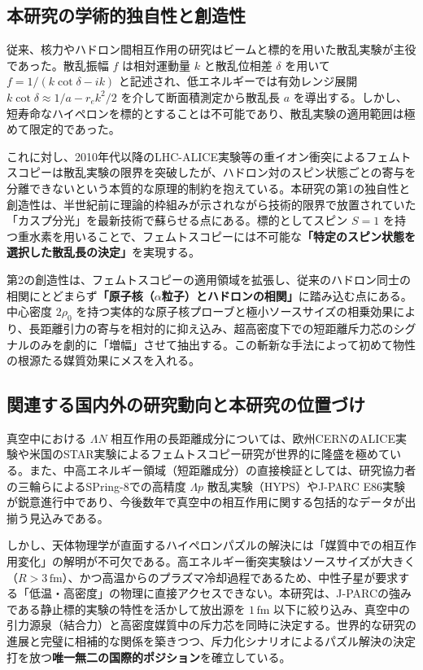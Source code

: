 \documentclass[11pt,a4j,dvipdfmx]{jarticle} 					%
\newcommand{\研究課題名}{加速器実験による短距離バリオン間相互作用の解明と中性子星ハイペロンパズルの解決}
\newcommand{\研究機関名}{東北大学}
\newcommand{\研究代表者氏名}{市川裕大}
\newcommand{\研究期間の最終元号年度}{13}  %
\begin{document}
\subsection{本研究の学術的独自性と創造性}
従来、核力やハドロン間相互作用の研究はビームと標的を用いた散乱実験が主役であった。散乱振幅 $f$ は相対運動量 $k$ と散乱位相差 $\delta$ を用いて $f = 1 / (k\cot\delta - i k)$ と記述され、低エネルギーでは有効レンジ展開 $k\cot\delta \approx 1/a - r_e k^2 / 2$ を介して断面積測定から散乱長 $a$ を導出する。しかし、短寿命なハイペロンを標的とすることは不可能であり、散乱実験の適用範囲は極めて限定的であった。

これに対し、2010年代以降のLHC-ALICE実験等の重イオン衝突によるフェムトスコピーは散乱実験の限界を突破したが、ハドロン対のスピン状態ごとの寄与を分離できないという本質的な原理的制約を抱えている。本研究の第1の独自性と創造性は、半世紀前に理論的枠組みが示されながら技術的限界で放置されていた「カスプ分光」を最新技術で蘇らせる点にある。標的としてスピン $S=1$ を持つ重水素を用いることで、フェムトスコピーには不可能な\textbf{「特定のスピン状態を選択した散乱長の決定」}を実現する。

第2の創造性は、フェムトスコピーの適用領域を拡張し、従来のハドロン同士の相関にとどまらず\textbf{「原子核（$\alpha$粒子）とハドロンの相関」}に踏み込む点にある。中心密度 $2\rho_0$ を持つ実体的な原子核プローブと極小ソースサイズの相乗効果により、長距離引力の寄与を相対的に抑え込み、超高密度下での短距離斥力芯のシグナルのみを劇的に「増幅」させて抽出する。この斬新な手法によって初めて物性の根源たる媒質効果にメスを入れる。

\subsection{関連する国内外の研究動向と本研究の位置づけ}
真空中における $\Lambda N$ 相互作用の長距離成分については、欧州CERNのALICE実験や米国のSTAR実験によるフェムトスコピー研究が世界的に隆盛を極めている。また、中高エネルギー領域（短距離成分）の直接検証としては、研究協力者の三輪らによるSPring-8での高精度 $\Lambda p$ 散乱実験（HYPS）やJ-PARC E86実験が鋭意進行中であり、今後数年で真空中の相互作用に関する包括的なデータが出揃う見込みである。

しかし、天体物理学が直面するハイペロンパズルの解決には「媒質中での相互作用変化」の解明が不可欠である。高エネルギー衝突実験はソースサイズが大きく（$R > 3\,\text{fm}$）、かつ高温からのプラズマ冷却過程であるため、中性子星が要求する「低温・高密度」の物理に直接アクセスできない。本研究は、J-PARCの強みである静止標的実験の特性を活かして放出源を $1\,\text{fm}$ 以下に絞り込み、真空中の引力源泉（結合力）と高密度媒質中の斥力芯を同時に決定する。世界的な研究の進展と完璧に相補的な関係を築きつつ、斥力化シナリオによるパズル解決の決定打を放つ\textbf{唯一無二の国際的ポジション}を確立している。
\end{document}
